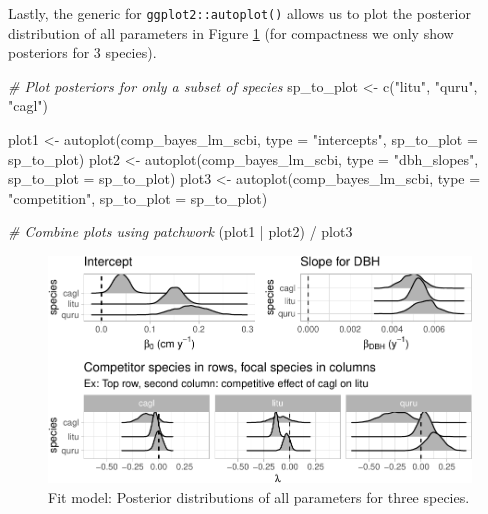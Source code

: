 \documentclass[12pt]{article}
\newenvironment{Shaded}{\begin{snugshade}}{\end{snugshade}}
\newcommand{\AttributeTok}[1]{\textcolor[rgb]{0.77,0.63,0.00}{#1}}
\newcommand{\CommentTok}[1]{\textcolor[rgb]{0.56,0.35,0.01}{\textit{#1}}}
\newcommand{\FunctionTok}[1]{\textcolor[rgb]{0.00,0.00,0.00}{#1}}
\newcommand{\NormalTok}[1]{#1}
\newcommand{\OtherTok}[1]{\textcolor[rgb]{0.56,0.35,0.01}{#1}}
\newcommand{\SpecialCharTok}[1]{\textcolor[rgb]{0.00,0.00,0.00}{#1}}
\newcommand{\StringTok}[1]{\textcolor[rgb]{0.31,0.60,0.02}{#1}}
\begin{document}
Lastly, the generic for \texttt{ggplot2::autoplot()} allows us to plot
the posterior distribution of all parameters in Figure
\ref{fig:scbi-posterior-viz} (for compactness we only show posteriors
for 3 species).

\begin{Shaded}
\begin{Highlighting}[]
\CommentTok{\# Plot posteriors for only a subset of species}
\NormalTok{sp\_to\_plot }\OtherTok{\textless{}{-}} \FunctionTok{c}\NormalTok{(}\StringTok{"litu"}\NormalTok{, }\StringTok{"quru"}\NormalTok{, }\StringTok{"cagl"}\NormalTok{)}

\NormalTok{plot1 }\OtherTok{\textless{}{-}} \FunctionTok{autoplot}\NormalTok{(comp\_bayes\_lm\_scbi, }\AttributeTok{type =} \StringTok{"intercepts"}\NormalTok{, }\AttributeTok{sp\_to\_plot =}\NormalTok{ sp\_to\_plot)}
\NormalTok{plot2 }\OtherTok{\textless{}{-}} \FunctionTok{autoplot}\NormalTok{(comp\_bayes\_lm\_scbi, }\AttributeTok{type =} \StringTok{"dbh\_slopes"}\NormalTok{, }\AttributeTok{sp\_to\_plot =}\NormalTok{ sp\_to\_plot)}
\NormalTok{plot3 }\OtherTok{\textless{}{-}} \FunctionTok{autoplot}\NormalTok{(comp\_bayes\_lm\_scbi, }\AttributeTok{type =} \StringTok{"competition"}\NormalTok{, }\AttributeTok{sp\_to\_plot =}\NormalTok{ sp\_to\_plot)}

\CommentTok{\# Combine plots using patchwork}
\NormalTok{(plot1 }\SpecialCharTok{|}\NormalTok{ plot2) }\SpecialCharTok{/}\NormalTok{ plot3}
\end{Highlighting}
\end{Shaded}

\begin{figure}

{\centering \includegraphics[width=1\linewidth]{Figures/scbi-posterior-viz-1} 

}

\caption{Fit model: Posterior distributions of all parameters for three species.}\label{fig:scbi-posterior-viz}
\end{figure}
\end{document}

